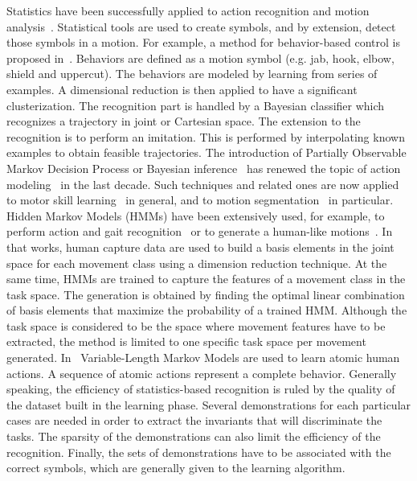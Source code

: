 \documentclass[journal]{IEEEtran}
\begin{document}
Statistics have been successfully applied
to action recognition and motion analysis~\cite{schaal03}.
Statistical tools are used to create symbols, and by extension, detect those
symbols in a motion. For example, a method for behavior-based control 
is proposed in~\cite{drumwright03, drumwright04}. Behaviors are defined 
as a motion symbol (e.g. jab, hook, elbow, shield and uppercut). 
The behaviors are modeled by learning from series of examples.
A dimensional reduction is then applied to have a significant
clusterization.  The recognition part is handled by a Bayesian classifier which
recognizes a trajectory in joint or Cartesian space. The extension to the recognition
is to perform an imitation. This is performed by interpolating known examples to obtain
feasible trajectories. 
The introduction of Partially Observable Markov Decision Process or Bayesian inference~\cite{pearl88} has
renewed the topic of action modeling~\cite{kaelbling98} in the last decade. Such
techniques and related ones are now applied to motor skill learning~\cite{peters08} in
general, and to motion segmentation~\cite{calinon10, inamura04} in particular. 
Hidden Markov Models (HMMs) have been extensively used,
for example, to perform action and gait recognition~\cite{gu10} or to generate 
a human-like motions~\cite{kwon08}. In that works, human capture data 
are used to build a basis elements in the joint space for each movement class 
using a dimension reduction technique. At the same time,
HMMs are trained to capture the features of a movement class in the task space. The generation
is obtained by finding the optimal linear combination of basis elements that maximize
the probability of a trained HMM. Although the task space is considered to be 
the space where movement features have to be extracted, the method is limited to one
specific task space per movement generated.
In~\cite{liang09} Variable-Length Markov Models are used to learn atomic human actions. A sequence
of atomic actions represent a complete behavior.
Generally speaking, the efficiency of statistics-based recognition is ruled by the quality of the dataset built
in the learning phase.
Several demonstrations for each particular cases are needed in order to extract
the invariants that will discriminate the tasks. The sparsity of the demonstrations
can also limit the efficiency of the recognition. Finally, the sets of demonstrations
have to be associated with the correct symbols, which are generally given to the learning algorithm.
\end{document}
